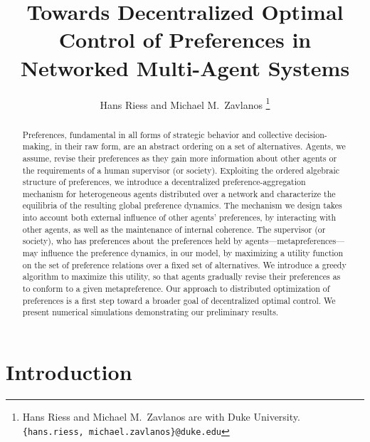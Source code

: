 \documentclass[conference]{ieeeconf}
\begin{document}
\title{\bf Towards Decentralized Optimal Control of Preferences in Networked Multi-Agent Systems}

\author{Hans Riess and Michael M.~Zavlanos%
\thanks{Hans Riess and Michael M.~Zavlanos are with Duke University.
        {\tt\small \{hans.riess, michael.zavlanos\}@duke.edu}}%
}
\maketitle

\begin{abstract}
Preferences, fundamental in all forms of strategic behavior and collective decision-making, in their raw form, are an abstract ordering on a set of alternatives. Agents, we assume, revise their preferences as they gain more information about other agents or the requirements of a human supervisor (or society). Exploiting the ordered algebraic structure of preferences,  we introduce a decentralized preference-aggregation mechanism for heterogeneous agents distributed over a network and characterize the equilibria of the resulting global preference dynamics. The mechanism we design takes into account both external influence of other agents' preferences, by interacting with other agents, as well as the maintenance of internal coherence. The supervisor (or society), who has preferences about the preferences held by agents---metapreferences---may influence the preference dynamics, in our model, by maximizing a utility function on the set of preference relations over a fixed set of alternatives. We introduce a greedy algorithm to maximize this utility, so that agents gradually revise their preferences as to conform to a given metapreference. Our approach to distributed optimization of preferences is a first step toward a broader goal of decentralized optimal control. We present numerical simulations demonstrating our preliminary results.
\end{abstract}


\section{Introduction}
\end{document}
